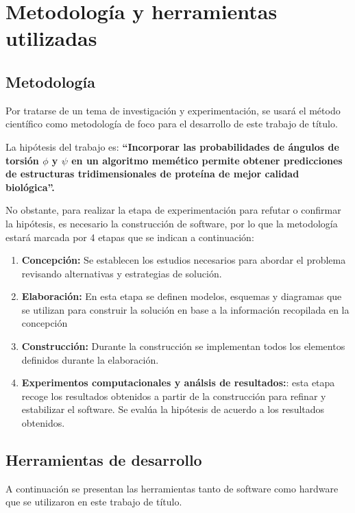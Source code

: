 \section{Metodolog\'ia y herramientas utilizadas}
\label{intro:metodologia}

\subsection{Metodolog\'ia}

Por tratarse de un tema de investigación y experimentación, se usará el método científico como metodología de foco para el desarrollo de este trabajo de título.

La hipótesis del trabajo es: \textbf{``Incorporar las probabilidades de ángulos de torsión $\phi$ y $\psi$ en un algoritmo memético permite obtener predicciones de estructuras tridimensionales de proteína de mejor calidad biológica''.}

No obstante, para realizar la etapa de experimentación para refutar o confirmar la hipótesis, es necesario la construcción de software, por lo que la metodología estará marcada por 4 etapas que se indican a continuación:

\begin{enumerate}
	\item \textbf{Concepción:} Se establecen los estudios necesarios para abordar el problema revisando alternativas y estrategias de solución.
	\item \textbf{Elaboración:} En esta etapa se definen modelos, esquemas y diagramas que se utilizan para construir la solución en base a la información recopilada en la concepción
	\item \textbf{Construcción:} Durante la construcción se implementan todos los elementos definidos durante la elaboración.
	\item \textbf{Experimentos computacionales y análsis de resultados:}: esta etapa recoge los resultados obtenidos a partir de la construcción para refinar y estabilizar el software. Se evalúa la hipótesis de acuerdo a los resultados obtenidos.
\end{enumerate}

\subsection{Herramientas de desarrollo}

A continuación se presentan las herramientas tanto de software como hardware que se utilizaron en este trabajo de título.

